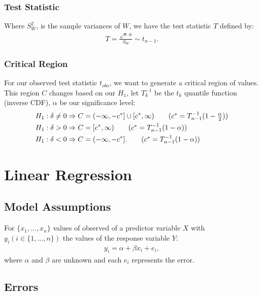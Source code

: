 \documentclass[a4paper, 12pt, twoside]{article}
\begin{document}
\subsubsection{Test Statistic}

Where $S_W^2$, is the sample variances of $W$, we have the
test statistic $T$ defined by:
\begin{align*}
    T = \frac{\sqrt{n} \, \overline{w}}{S_W} \sim t_{n - 1}.
\end{align*}

\subsubsection{Critical Region}

For our observed test statistic $t_{obs}$, we want to generate a
critical region of values. This region $C$ changes based on our
$H_1$, let $T^{-1}_k$ be the $t_k$ quantile function (inverse CDF),
$\alpha$ be our significance level:
\begin{align*}
    H_1 : \delta \neq 0 & \Rightarrow
    C = (-\infty, -c^*] \cup [c^*, \infty)
    \tag{$ c^* = T^{-1}_{n - 1}(1 - \frac{\alpha}{2}) $}         \\
    H_1 : \delta > 0    & \Rightarrow
    C = [c^*, \infty) \tag{$ c^* = T^{-1}_{n - 1}(1 - \alpha) $} \\
    H_1 : \delta < 0    & \Rightarrow C = (-\infty, -c^*].
    \tag{$ c^* = T^{-1}_{n - 1}(1 - \alpha) $}
\end{align*}

\newpage

\section{Linear Regression}

\subsection{Model Assumptions}

For $\{x_1, \ldots, x_n\}$ values of observed of a predictor
variable $X$ with $y_i (i \in \{1, \ldots, n\})$ the values
of the response variable $Y$:
\begin{align*}
    y_i = \alpha + \beta x_i + e_i,
\end{align*}
where $\alpha$ and $\beta$ are unknown and each $e_i$ represents the
error.

\subsection{Errors}
\end{document}
